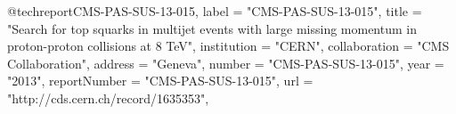 @techreport{CMS-PAS-SUS-13-015,
      label          = "CMS-PAS-SUS-13-015",
      title         = "{Search for top squarks in multijet events with large
                       missing momentum in proton-proton collisions at 8 TeV}",
      institution   = "CERN",
      collaboration = "CMS Collaboration",
      address       = "Geneva",
      number        = "CMS-PAS-SUS-13-015",
      year          = "2013",
      reportNumber  = "CMS-PAS-SUS-13-015",
      url           = "http://cds.cern.ch/record/1635353",
}

